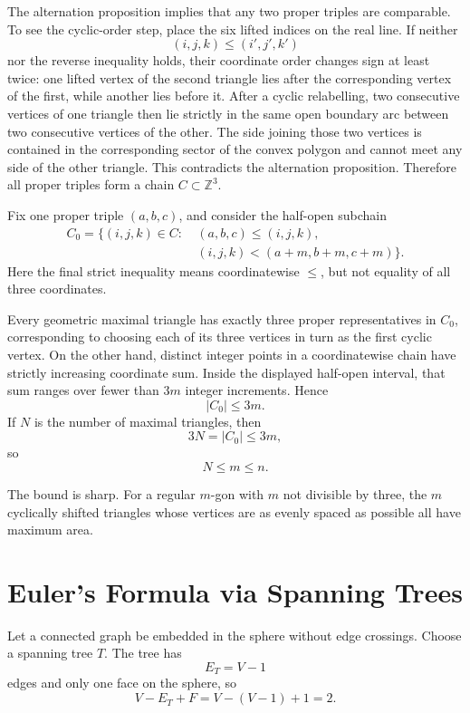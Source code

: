 The alternation proposition implies that any two proper triples are comparable.  To see the cyclic-order step, place the six lifted indices on the real line.  If neither
\[
  (i,j,k)\le(i',j',k')
\]
nor the reverse inequality holds, their coordinate order changes sign at least twice: one lifted vertex of the second triangle lies after the corresponding vertex of the first, while another lies before it.  After a cyclic relabelling, two consecutive vertices of one triangle then lie strictly in the same open boundary arc between two consecutive vertices of the other.  The side joining those two vertices is contained in the corresponding sector of the convex polygon and cannot meet any side of the other triangle.  This contradicts the alternation proposition.  Therefore all proper triples form a chain \(C\subset\mathbb Z^3\).

Fix one proper triple \((a,b,c)\), and consider the half-open subchain
\[
\begin{aligned}
  C_0=\{(i,j,k)\in C:\ &(a,b,c)\le(i,j,k),\\
  &(i,j,k)<(a+m,b+m,c+m)\}.
\end{aligned}
\]
Here the final strict inequality means coordinatewise \(\le\), but not equality of all three coordinates.

Every geometric maximal triangle has exactly three proper representatives in \(C_0\), corresponding to choosing each of its three vertices in turn as the first cyclic vertex.  On the other hand, distinct integer points in a coordinatewise chain have strictly increasing coordinate sum.  Inside the displayed half-open interval, that sum ranges over fewer than \(3m\) integer increments.  Hence
\[
  |C_0|\le3m.
\]
If \(N\) is the number of maximal triangles, then
\[
  3N=|C_0|\le3m,
\]
so
\[
  \boxed{N\le m\le n.}
\]

The bound is sharp.  For a regular \(m\)-gon with \(m\) not divisible by three, the \(m\) cyclically shifted triangles whose vertices are as evenly spaced as possible all have maximum area.

\section{Euler's Formula via Spanning Trees}

Let a connected graph be embedded in the sphere without edge crossings.  Choose a spanning tree \(T\).  The tree has
\[
  E_T=V-1
\]
edges and only one face on the sphere, so
\[
  V-E_T+F
  =V-(V-1)+1=2.
\]

